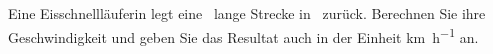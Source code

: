 Eine Eisschnellläuferin legt eine \sEO\ lange Strecke in \tEO\ zurück. Berechnen Sie ihre Geschwindigkeit und geben Sie das Resultat auch in der Einheit \si{\kilo\meter\per\hour} an.
